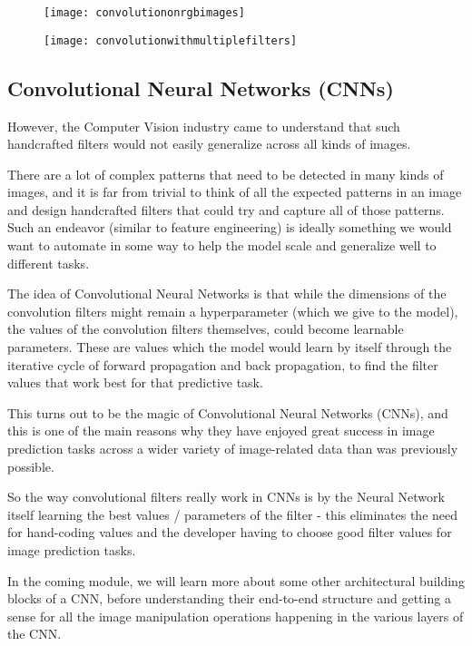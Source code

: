 	\begin{figure}[h]
		\centering
		\texttt{[image: convolutiononrgbimages]}
		\caption{}
		\label{fig:convolutiononrgbimages}
	\end{figure}
	\begin{figure}[h]
		\centering
		\texttt{[image: convolutionwithmultiplefilters]}
		\caption{}
		\label{fig:convolutionwithmultiplefilters}
	\end{figure}


	\subsection{Convolutional Neural Networks (CNNs)}
	\begin{bulletedlist}
		\item However, the Computer Vision industry came to understand that such handcrafted filters would not easily generalize across all kinds of images.
		\item There are a lot of complex patterns that need to be detected in many kinds of images, and it is far from trivial to think of all the expected patterns in an image and design handcrafted filters that could try and capture all of those patterns. Such an endeavor (similar to feature engineering) is ideally something we would want to automate in some way to help the model scale and generalize well to different tasks.
		\item The idea of Convolutional Neural Networks is that while the dimensions of the convolution filters might remain a hyperparameter (which we give to the model), the values of the convolution filters themselves, could become learnable parameters. These are values which the model would learn by itself through the iterative cycle of forward propagation and back propagation, to find the filter values that work best for that predictive task.
		\item This turns out to be the magic of Convolutional Neural Networks (CNNs), and this is one of the main reasons why they have enjoyed great success in image prediction tasks across a wider variety of image-related data than was previously possible.
		\item So the way convolutional filters really work in CNNs is by the Neural Network itself learning the best values / parameters of the filter - this eliminates the need for hand-coding values and the developer having to choose good filter values for image prediction tasks.
		\item In the coming module, we will learn more about some other architectural building blocks of a CNN, before understanding their end-to-end structure and getting a sense for all the image manipulation operations happening in the various layers of the CNN.
	\end{bulletedlist}

